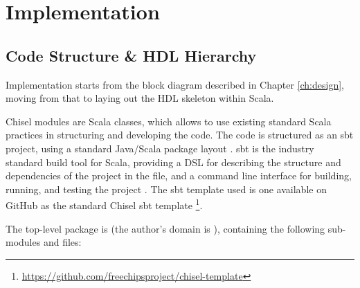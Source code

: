 \chapter{Implementation}
\label{ch:implementation}

\section{Code Structure \& HDL Hierarchy}
Implementation starts from the block diagram described in Chapter \ref{ch:design}, moving from that to laying out the HDL skeleton within Scala.

Chisel modules are Scala classes, which allows to use existing standard Scala practices in structuring and developing the code. The code is structured as an sbt project, using a standard Java/Scala package layout \cite{scala_style}. sbt is the industry standard build tool for Scala, providing a DSL for describing the structure and dependencies of the project in the  file, and a command line interface for building, running, and testing the project \cite{sbt}. The sbt template used is one available on GitHub as the standard Chisel sbt template \footnote{\url{https://github.com/freechipsproject/chisel-template}}.

The top-level package is  (the author's domain is ), containing the following sub-modules and files:


